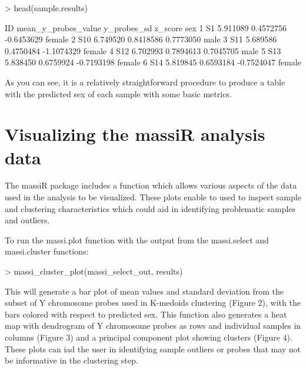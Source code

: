 \documentclass{article}
\begin{document}
\begin{Schunk}
\begin{Sinput}
> head(sample.results)
\end{Sinput}
\begin{Soutput}
   ID mean_y_probes_value y_probes_sd    z_score    sex
1  S1            5.911089   0.4572756 -0.6453629 female
2 S10            6.749520   0.8418586  0.7773050   male
3 S11            5.689586   0.4750484 -1.1074329 female
4 S12            6.702993   0.7894613  0.7045705   male
5 S13            5.838450   0.6759924 -0.7193198 female
6 S14            5.819845   0.6593184 -0.7524047 female
\end{Soutput}
\end{Schunk}

As you can see, it is a relatively straightforward procedure to produce a table with the predicted sex of each sample with some basic metrics.

\section{Visualizing the massiR analysis data}

The massiR package includes a function which allows various aspects of the data used in the analysis to be visualized. These plots enable to used to inspect sample and clustering characteristics which could aid in identifying problematic samples and outliers.

To run the massi.plot function with the output from the massi.select and massi.cluster functions:
\begin{Schunk}
\begin{Sinput}
> massi_cluster_plot(massi_select_out, results)
\end{Sinput}
\end{Schunk}
This will generate a bar plot of mean values and standard deviation from the subset of Y chromosome probes used in K-medoids clustering (Figure 2), with the bars colored with respect to predicted sex. This function also generates a heat map with dendrogram of Y chromosome probes as rows and individual samples in columns (Figure 3) and a principal component plot showing clusters (Figure 4). These plots can iad the user in identifying sample outliers or probes that may not be informative in the clustering step. 

\clearpage
\end{document}
